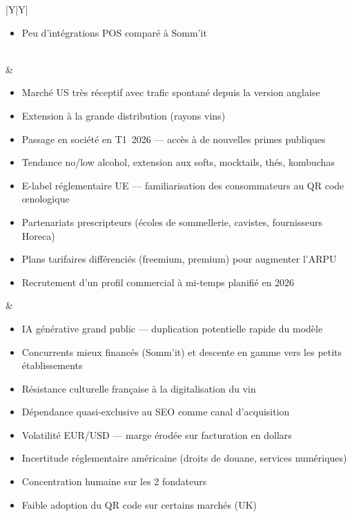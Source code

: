 \documentclass[12pt, a4paper]{article}
\begin{document}
{\begin{tabularx}{\linewidth}{|Y|Y|}
\begin{itemize}[leftmargin=1em, topsep=1pt, itemsep=0pt, parsep=0pt]
    \item Peu d'intégrations POS comparé à Somm'it
  \end{itemize} \\
  \hline
   &
   \\
  \hline
  \begin{itemize}[leftmargin=1em, topsep=1pt, itemsep=0pt, parsep=0pt]
    \item Marché US très réceptif avec trafic spontané depuis la version anglaise
    \item Extension à la grande distribution (rayons vins)
    \item Passage en société en T1~2026 — accès à de nouvelles primes publiques
    \item Tendance no/low alcohol, extension aux softs, mocktails, thés, kombuchas
    \item E-label réglementaire UE — familiarisation des consommateurs au QR code œnologique
    \item Partenariats prescripteurs (écoles de sommellerie, cavistes, fournisseurs Horeca)
    \item Plans tarifaires différenciés (freemium, premium) pour augmenter l'ARPU
    \item Recrutement d'un profil commercial à mi-temps planifié en 2026
  \end{itemize} &
  \begin{itemize}[leftmargin=1em, topsep=1pt, itemsep=0pt, parsep=0pt]
    \item IA générative grand public — duplication potentielle rapide du modèle
    \item Concurrents mieux financés (Somm'it) et descente en gamme vers les petits établissements
    \item Résistance culturelle française à la digitalisation du vin
    \item Dépendance quasi-exclusive au SEO comme canal d'acquisition
    \item Volatilité EUR/USD — marge érodée sur facturation en dollars
    \item Incertitude réglementaire américaine (droits de douane, services numériques)
    \item Concentration humaine sur les 2 fondateurs
    \item Faible adoption du QR code sur certains marchés (UK)
  \end{itemize} \\
  \hline
\end{tabularx}
}
\end{document}
